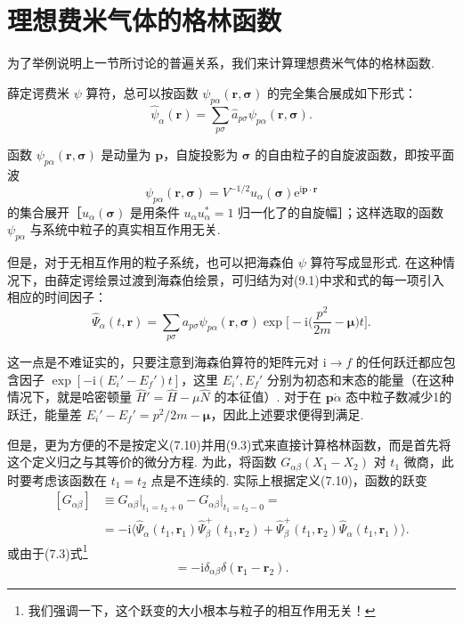 \section{理想费米气体的格林函数}

为了举例说明上一节所讨论的普遍关系，我们来计算理想费米气体的格林函数.

薛定谔费米 $\psi$ 算符，总可以按函数 $\psi_{p\alpha}(\bm r,\bm\sigma)$ 的完全集合展成如下形式：
\begin{equation}
\hat\psi_\alpha(\bm r)=\sum_{p\sigma}\hat a_{p\sigma}\psi_{p\alpha}(\bm r,\bm\sigma).
\end{equation}

函数 $\psi_{p\alpha}(\bm r,\bm\sigma)$ 是动量为 $\bm p$，自旋投影为 $\bm\sigma$ 的自由粒子的自旋波函数，即按平面波
\begin{equation}
\psi_{p\alpha}(\bm r,\bm\sigma)=V^{-1/2}u_\alpha(\bm\sigma)\mathrm{e}^{\mathrm{i}\bm p\cdot\bm r}
\end{equation}
的集合展开［$u_\alpha(\bm\sigma)$ 是用条件 $u_\alpha u^{*}_\alpha=1$ 归一化了的自旋幅］；这样选取的函数 $\psi_{p\alpha}$ 与系统中粒子的真实相互作用无关.

但是，对于无相互作用的粒子系统，也可以把海森伯 $\psi$ 算符写成显形式. 在这种情况下，由薛定谔绘景过渡到海森伯绘景，可归结为对(9.1)中求和式的每一项引入相应的时间因子：
\begin{equation}
\hat\Psi_\alpha(t,\bm r)=\sum_{p\sigma}a_{p\sigma}\psi_{p\alpha}(\bm r,\bm\sigma)\exp\Big[-\mathrm{i}\Big(\frac{p^2}{2m}-\bm\mu\Big)t\Big].
\end{equation}

这一点是不难证实的，只要注意到海森伯算符的矩阵元对 $\mathrm{i}\to f$ 的任何跃迁都应包含因子 $\exp[-\mathrm{i}(E_i'-E_f')t]$，这里 $E_i',E_f'$ 分别为初态和末态的能量（在这种情况下，就是哈密顿量 $\hat H'=\hat H-\mu\hat N$ 的本征值）. 对于在 $\bm p\dot\alpha$ 态中粒子数减少1的跃迁，能量差 $E_i'-E_f'=p^2/2m-\bm\mu$，因此上述要求便得到满足.

但是，更为方便的不是按定义(7.10)并用(9.3)式来直接计算格林函数，而是首先将这个定义归之与其等价的微分方程. 为此，将函数 $G_{\alpha\beta}(X_1-X_2)$ 对 $t_1$ 微商，此时要考虑该函数在 $t_1=t_2$ 点是不连续的. 实际上根据定义(7.10)，函数的跃变
\begin{equation*}
\begin{aligned}
[G_{\alpha\beta}]&\equiv G_{\alpha\beta}\big|_{t_1=t_2+0}-G_{\alpha\beta}\big|_{t_1=t_2-0}=\\
&=-\mathrm{i}\big\langle\hat\Psi_\alpha(t_1,\bm r_1)\hat\Psi^{+}_\beta(t_1,\bm r_2)+\hat\Psi^{+}_\beta(t_1,\bm r_2)\hat\Psi_\alpha(t_1,\bm r_1)\big\rangle.
\end{aligned}
\end{equation*}
或由于(7.3)式\footnote{我们强调一下，这个跃变的大小根本与粒子的相互作用无关！}
\begin{equation}
[G_{\alpha\beta}]=-\mathrm{i}\delta_{\alpha\beta}\delta(\bm r_1-\bm r_2).
\end{equation}

